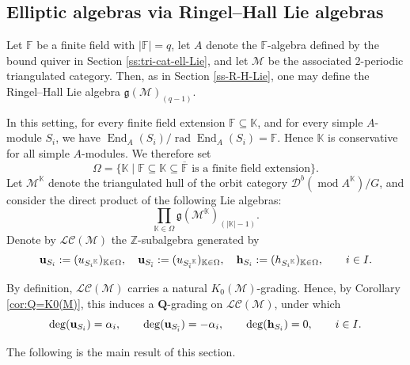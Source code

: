 \documentclass[12pt,reqno]{amsart}
\numberwithin{equation}{section}
\renewcommand{\mod}{\operatorname{mod}\nolimits}
\renewcommand{\deg}{\operatorname{deg}\nolimits}
\def \ov{\overline}
\newcommand{\go}{{K_0}}
\begin{document}
	
	
	
	
	\subsection{Elliptic algebras via Ringel--Hall Lie algebras}
	Let $\mathbb{F}$ be a finite field with $|\mathbb{F}|=q$, let $A$ denote the $\mathbb{F}$-algebra defined by the bound quiver in Section \ref{ss:tri-cat-ell-Lie}, and let $\mathcal{M}$ be the associated $2$-periodic triangulated category. Then, as in Section \ref{ss-R-H-Lie}, one may define the Ringel--Hall Lie algebra $\mathfrak{g}(\mathcal{M})_{(q-1)}$. 
	
	In this setting, for every finite field extension $\mathbb{F}\subseteq \mathbb{K}$, and for every simple $A$-module $S_i$, we have
	$\operatorname{End}_A(S_i)/\operatorname{rad}\operatorname{End}_A(S_i)=\mathbb{F}.$
	Hence $\mathbb{K}$ is conservative for all simple $A$-modules. We therefore set
	\[
	\Omega=\{\mathbb{K}\mid \mathbb{F}\subseteq \mathbb{K}\subseteq \ov{\mathbb{F}} \text{ is a finite field extension}\}.    
	\]
	Let $\mathcal{M}^{\mathbb{K}}$ denote the triangulated hull of the orbit category $\mathcal{D}^b(\mod A^{\mathbb{K}})/G$, and consider the direct product of the following Lie algebras:
	\[
	\prod_{\mathbb{K}\in \Omega}\mathfrak{g}(\mathcal{M}^{\mathbb{K}})_{(|\mathbb{K}|-1)}.    
	\]
	Denote by $\mathscr{LC}(\mathcal{M})$ the $\mathbb{Z}$-subalgebra generated by
	\begin{align*}
		{\bf u}_{S_i}:=(u_{{S_i}^\mathbb{K}})_{\mathbb{K}\in\Omega},\quad
		{\bf u}_{ S_{\bar i}}:=
		(u_{ {S_{\bar i}}^\mathbb{K}})_{\mathbb{K}\in\Omega},\quad
		{\bf h}_{S_i}:=(h_{{S_i}^\mathbb{K}})_{\mathbb{K}\in\Omega},
		\qquad i\in I.
	\end{align*}
	
	By definition, $\mathscr{LC}(\mathcal{M})$ carries a natural $\go(\mathcal{M})$-grading. Hence, by Corollary \ref{cor:Q=K0(M)}, this induces a $\mathbf{Q}$-grading on $\mathscr{LC}(\mathcal{M})$, under which
	\[
	\deg({\bf u}_{S_i})=\alpha_i,\qquad
	\deg({\bf u}_{ S_{\bar i}})=-\alpha_i,\qquad
	\deg({\bf h}_{S_i})=0,\qquad i\in I.
	\]
	
	The following is the main result of this section.
	
\end{document}
